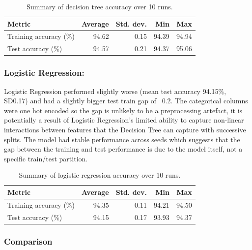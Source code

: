 \documentclass[12pt]{article}
\begin{document}
\begin{table}[H]
\centering
\caption{Summary of decision tree accuracy over 10 runs.}
\begin{tabular}{lrrrr}
\hline
Metric & Average & Std. dev. & Min & Max \\
\hline
Training accuracy (\%) & 94.62 & 0.15 & 94.39 & 94.94 \\
Test accuracy (\%)     & 94.57 & 0.21 & 94.37 & 95.06 \\
\hline
\end{tabular}
\end{table}

\subsubsection{Logistic Regression:}


Logistic Regression performed slightly worse (mean test accuracy 94.15\%, SD0.17) and had a slightly bigger test train gap of ~0.2. The categorical columns were one hot encoded so the gap is unlikely to be a preprocessing artefact, it is potentially a result of Logistic Regression’s limited ability to capture non-linear interactions between features that the Decision Tree can capture with successive splits. The model had stable performance across seeds which suggests that the gap between the training and test performance is due to the model itself, not a specific train/test partition.



\begin{table}[H]
\centering
\caption{Summary of logistic regression accuracy over 10 runs.}
\begin{tabular}{lrrrr}
\hline
Metric & Average & Std. dev. & Min & Max \\
\hline
Training accuracy (\%) & 94.35 & 0.11 & 94.21 & 94.50 \\
Test accuracy (\%)     & 94.15 & 0.17 & 93.93 & 94.37 \\
\hline
\end{tabular}
\end{table}


\subsubsection{Comparison}
\end{document}

